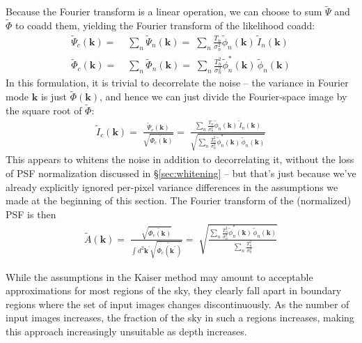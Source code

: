 \documentclass[10pt]{article}
\newcommand{\secref}[1]{\S\ref{sec:#1}}
\begin{document}
Because the Fourier transform is a linear operation, we can choose to sum $\tilde{\Psi}$ and $\tilde{\Phi}$ to coadd them, yielding the Fourier transform of the likelihood coadd:
\begin{align}
\tilde{\Psi}_c(\bm{k}) =\;& \sum_n \tilde{\Psi}_n(\bm{k})
    =\; \sum_n \frac{T_n}{\sigma_n^2}
            \tilde{\phi}_n(\bm{k}) \, \tilde{I}_n(\bm{k}) \\
\tilde{\Phi}_c(\bm{k}) =\;&
    \sum_n \tilde{\Phi}_n(\bm{k})
    =\; \sum_n
    \frac{T_n^2}{\sigma_n^2}
        \tilde{\phi}^*_n(\bm{k}) \, \tilde{\phi}_n(\bm{k})
\end{align}
In this formulation, it is trivial to decorrelate the noise -- the variance in Fourier mode $\bm{k}$ is just $\tilde{\Phi}(\bm{k})$, and hence we can just divide the Fourier-space image by the square root of $\tilde{\Phi}$:
\begin{align}
    \tilde{I}_c(\bm{k}) =\;
        \frac{\tilde{\Psi}_c(\bm{k})}{\sqrt{\tilde{\Phi_c(\bm{k})}}}
    =\;
        \frac{
            \sum\limits_n \frac{T_n}{\sigma_n^2}
                \tilde{\phi}_n(\bm{k}) \, \tilde{I}_n(\bm{k})
        }{
            \sqrt{
                \sum\limits_n
                \frac{T_n^2}{\sigma_n^2}
                    \tilde{\phi}^*_n(\bm{k}) \, \tilde{\phi}_n(\bm{k})
            }
        }
    \label{eqn:kaiser-coadd}
\end{align}
This appears to whitens the noise in addition to decorrelating it, without the loss of PSF normalization discussed in \secref{whitening} -- but that's just because we've already explicitly ignored per-pixel variance differences in the assumptions we made at the beginning of this section.  The Fourier transform of the (normalized) PSF is then
\begin{align}
    \tilde{A}(\bm{k}) =\;
        \frac{
            \sqrt{\tilde{\Phi_c(\bm{k})}}
        }{
            \displaystyle\int d^2 \bm{k^\prime}
                \sqrt{\tilde{\Phi_c(\bm{k}^\prime)}}
        }
    =\;
        \sqrt{
            \frac{
                \sum\limits_n
                \frac{T_n^2}{\sigma_n^2}
                    \tilde{\phi}^*_n(\bm{k}) \, \tilde{\phi}_n(\bm{k})
            }{
                \sum\limits_n \frac{T_n^2}{\sigma_n^2}
            }
        }
    \label{eqn:kaiser-psf}
\end{align}

While the assumptions in the Kaiser method may amount to acceptable approximations for most regions of the sky, they clearly fall apart in boundary regions where the set of input images changes discontinuously.  As the number of input images increases, the fraction of the sky in such a regions increases, making this approach increasingly unsuitable as depth increases.
\end{document}
